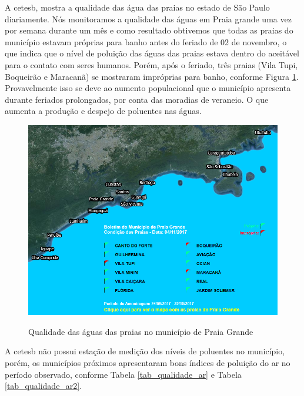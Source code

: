 	
	A \gls{cetesb}, mostra a qualidade das água das praias no estado de São Paulo diariamente. Nós monitoramos a qualidade das águas em Praia grande uma vez por semana durante um mês e como resultado obtivemos que todas as praias do município estavam próprias para banho antes do feriado de 02 de novembro, o que indica que o nível de poluição das águas das praias estava dentro do aceitável para o contato com seres humanos. Porém, após o feriado, três praias (Vila Tupi, Boqueirão e Maracanã) se mostraram impróprias para banho, conforme Figura \ref{mapa_qualidade_agua}. Provavelmente isso se deve ao aumento populacional que o município apresenta durante feriados prolongados, por conta das moradias de veraneio. O que aumenta a produção e despejo de poluentes nas águas.
	
	\begin{figure}[!htb]
		\centering
		\caption{Qualidade das águas das praias no município de Praia Grande}
		\includegraphics[width=1\textwidth]{img/mapa_qualidade_agua.png}
		\label{mapa_qualidade_agua}
	\end{figure}
	
	A \gls{cetesb} não possui estação de medição dos níveis de poluentes no município, porém, os municípios próximos apresentaram bons índices de poluição do ar no período observado, conforme Tabela \ref{tab_qualidade_ar} e Tabela \ref{tab_qualidade_ar2}.
	
